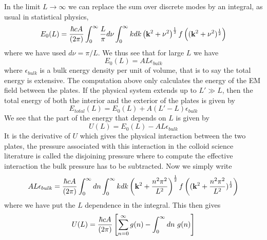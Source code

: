 In the limit $L\to\infty$ we can replace the sum over discrete modes by an integral, as usual in statistical physics, 
\begin{equation}
E_0(L) = {\hbar c A\over (2\pi)}\int_{0}^\infty {L\over \pi}d\nu \int_0^\infty kdk \left({\bf k}^2 + \nu^2\right)^{1\over 2}f\left(({\bf k}^2 + \nu^2)^{1\over 2}\right)
\end{equation}
where we have used $d\nu = \pi/L$. We thus see that for large $L$ we have
\begin{equation}
E_0(L) = AL \epsilon_{bulk}
\end{equation}
where $\epsilon_{bulk}$ is a bulk energy density per unit of volume, that is to say the total energy is extensive.  The computation above only calculates the energy of the EM field between the plates. If the physical system extends up to $L'\gg L$, then the total energy of {\color{red} both the interior and the exterior of the plates} is
given by
\begin{equation}
E_{total}(L) = E_0(L) + A(L'-L)\epsilon_{bulk}
\end{equation}
We see that the part of the energy that depends on $L$ is given by
\begin{equation}
U(L) = E_0(L)- AL\epsilon_{bulk}
\end{equation}
It is the derivative of $U$ which gives the physical interaction between the two plates, the pressure associated with this interaction in the colloid science literature is called the disjoining pressure \cite{stubenrauch_disjoining_2003} where to compute the effective interaction the bulk pressure has to be subtracted.
Now we simply write 
\begin{equation}
AL\epsilon_{bulk} = {\hbar c A\over (2\pi)}\int_{0}^\infty dn \int_0^\infty kdk \left({\bf k}^2 + {n^2\pi^2\over L^2}\right)^{1\over 2} f\left(({\bf k}^2 + {n^2\pi^2\over L^2})^{1\over 2}\right)
\end{equation}
where we have put the $L$ dependence in the integral. This then gives
\begin{equation}
U(L) = {\hbar c A\over (2\pi)}\left[\sum_{n=0}^\infty g(n) -\int_0^\infty dn \ g(n)\right]
\end{equation}

